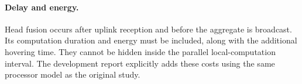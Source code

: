 \paragraph{Delay and energy.}
Head fusion occurs after uplink reception and before the aggregate is
broadcast. Its computation duration and energy must be included, along
with the additional hovering time. They cannot be hidden inside the
parallel local-computation interval. The development report explicitly
adds these costs using the same processor model as the original study.

